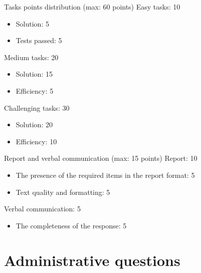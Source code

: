 \documentclass{beamer}
\begin{document}
\begin{frame}{Tasks points distribution (max: 60 points)}
    Easy tasks: 10
    \begin{itemize}
        \item Solution: 5
        \item Tests passed: 5
    \end{itemize}
    Medium tasks: 20
    \begin{itemize}
        \item Solution: 15
        \item Efficiency: 5
    \end{itemize}
    Challenging tasks: 30
    \begin{itemize}
        \item Solution: 20
        \item Efficiency: 10
    \end{itemize}
\end{frame}

\begin{frame}{Report and verbal communication (max: 15 points)}
    Report: 10
    \begin{itemize}
        \item The presence of the required items in the report format: 5
        \item Text quality and formatting: 5
    \end{itemize}
    Verbal communication: 5
    \begin{itemize}
        \item The completeness of the response: 5
    \end{itemize}
\end{frame}

\section{Administrative questions}
\end{document}
